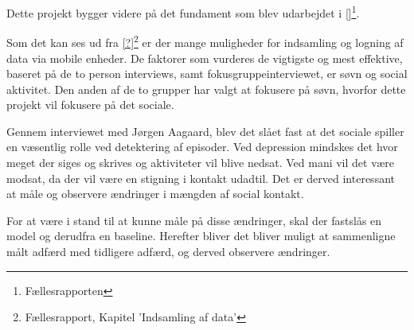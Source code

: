 Dette projekt bygger videre på det fundament som blev udarbejdet i \cref{}\footnote{Fællesrapporten}.

Som det kan ses ud fra \cref{?}\footnote{Fællesrapport, Kapitel 'Indsamling af data'} er der mange muligheder for indsamling og logning af data via mobile enheder.
De faktorer som vurderes de vigtigste og mest effektive, baseret på de to person interviews, samt fokusgruppeinterviewet, er søvn og social aktivitet.
Den anden af de to grupper har valgt at fokusere på søvn, hvorfor dette projekt vil fokusere på det sociale.

Gennem interviewet med Jørgen Aagaard, blev det slået fast at det sociale spiller en væsentlig rolle ved detektering af episoder.
Ved depression mindskes det hvor meget der siges og skrives og aktiviteter vil blive nedsat.
Ved mani vil det være modsat, da der vil være en stigning i kontakt udadtil.
Det er derved interessant at måle og observere ændringer i mængden af social kontakt.

For at være i stand til at kunne måle på disse ændringer, skal der fastslås en model og derudfra en baseline.
Herefter bliver det bliver muligt at sammenligne målt adfærd med tidligere adfærd, og derved observere ændringer.